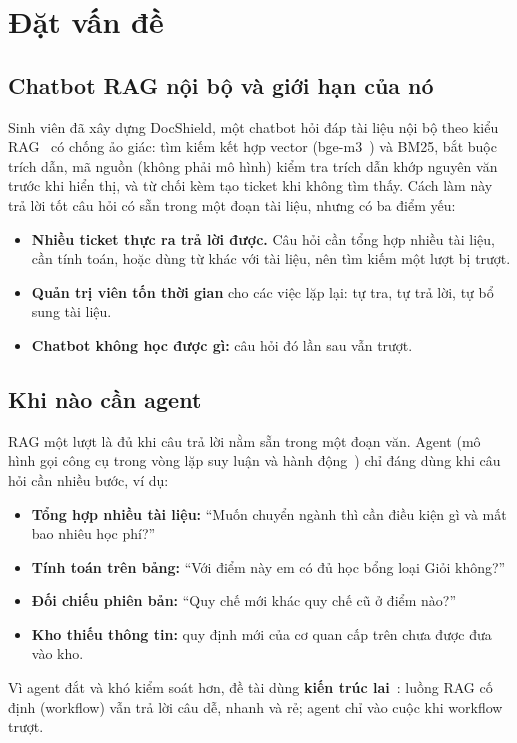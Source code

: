\documentclass[11pt,a4paper]{article}
\begin{document}
\section{Đặt vấn đề}

\subsection{Chatbot RAG nội bộ và giới hạn của nó}
Sinh viên đã xây dựng DocShield, một chatbot hỏi đáp tài liệu nội bộ theo kiểu RAG~\cite{rag} có chống ảo
giác: tìm kiếm kết hợp vector (bge-m3~\cite{bgem3}) và BM25, bắt buộc trích dẫn, mã nguồn (không phải mô
hình) kiểm tra trích dẫn khớp nguyên văn trước khi hiển thị, và từ chối kèm tạo ticket khi không tìm thấy.
Cách làm này trả lời tốt câu hỏi có sẵn trong một đoạn tài liệu, nhưng có ba điểm yếu:
\begin{itemize}
  \item \textbf{Nhiều ticket thực ra trả lời được.} Câu hỏi cần tổng hợp nhiều tài liệu, cần tính toán, hoặc
        dùng từ khác với tài liệu, nên tìm kiếm một lượt bị trượt.
  \item \textbf{Quản trị viên tốn thời gian} cho các việc lặp lại: tự tra, tự trả lời, tự bổ sung tài liệu.
  \item \textbf{Chatbot không học được gì:} câu hỏi đó lần sau vẫn trượt.
\end{itemize}

\subsection{Khi nào cần agent}
RAG một lượt là đủ khi câu trả lời nằm sẵn trong một đoạn văn. Agent (mô hình gọi công cụ trong vòng lặp
suy luận và hành động~\cite{react}) chỉ đáng dùng khi câu hỏi cần nhiều bước, ví dụ:
\begin{itemize}
  \item \textbf{Tổng hợp nhiều tài liệu:} ``Muốn chuyển ngành thì cần điều kiện gì và mất bao nhiêu học phí?''
  \item \textbf{Tính toán trên bảng:} ``Với điểm này em có đủ học bổng loại Giỏi không?''
  \item \textbf{Đối chiếu phiên bản:} ``Quy chế mới khác quy chế cũ ở điểm nào?''
  \item \textbf{Kho thiếu thông tin:} quy định mới của cơ quan cấp trên chưa được đưa vào kho.
\end{itemize}
Vì agent đắt và khó kiểm soát hơn, đề tài dùng \textbf{kiến trúc lai}~\cite{anthropic-agents}: luồng RAG
cố định (workflow) vẫn trả lời câu dễ, nhanh và rẻ; agent chỉ vào cuộc khi workflow trượt.
\end{document}
